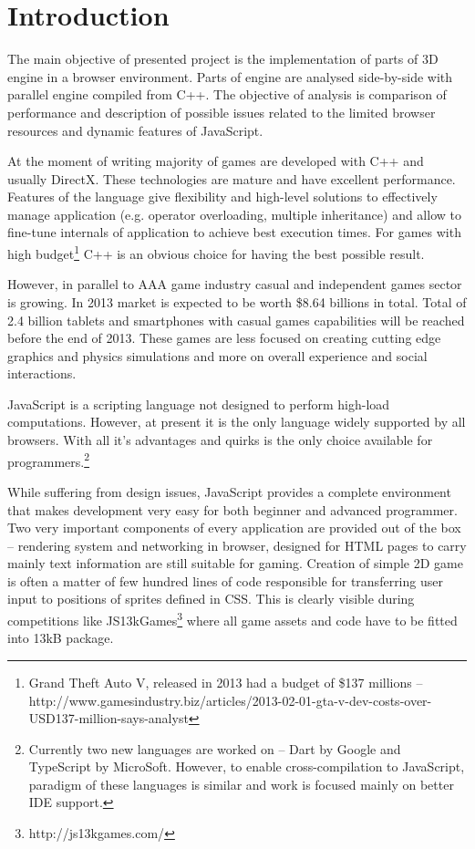 \chapter{Introduction}
\label{cha:introduction}

The main objective of presented project is the implementation of parts of 3D engine in a browser environment. Parts of engine are analysed side-by-side with parallel engine compiled from C++. The objective of analysis is comparison of performance and description of possible issues related to the limited browser resources and dynamic features of JavaScript.

At the moment of writing majority of games are developed with C++ and usually DirectX. These technologies are mature and have excellent performance. Features of the language give flexibility and high-level solutions to effectively manage application (e.g. operator overloading, multiple inheritance) and allow to fine-tune internals of application to achieve best execution times. For games with high budget\footnote{Grand Theft Auto V, released in 2013 had a budget of \$137 millions -- http://www.gamesindustry.biz/articles/2013-02-01-gta-v-dev-costs-over-USD137-million-says-analyst} C++ is an obvious choice for having the best possible result.

However, in parallel to AAA game industry casual and independent games sector is growing. In 2013 market is expected to be worth \$8.64 billions in total. Total of 2.4 billion tablets and smartphones with casual games capabilities will be reached before the end of 2013. These games are less focused on creating cutting edge graphics and physics simulations and more on overall experience and social interactions.

JavaScript is a scripting language not designed to perform high-load computations. However, at present it is the only language widely supported by all browsers. With all it's advantages and quirks is the only choice available for programmers.\footnote{Currently two new languages are worked on -- Dart by Google and TypeScript by MicroSoft. However, to enable cross-compilation to JavaScript, paradigm of these languages is similar and work is focused mainly on better IDE support.}

While suffering from design issues, JavaScript provides a complete environment that makes development very easy for both beginner and advanced programmer. Two very important components of every application are provided out of the box -- rendering system and networking in browser, designed for HTML pages to carry mainly text information are still suitable for gaming. Creation of simple 2D game is often a matter of few hundred lines of code responsible for transferring user input to positions of sprites defined in CSS. This is clearly visible during competitions like JS13kGames\footnote{http://js13kgames.com/} where all game assets and code have to be fitted into 13kB package.


